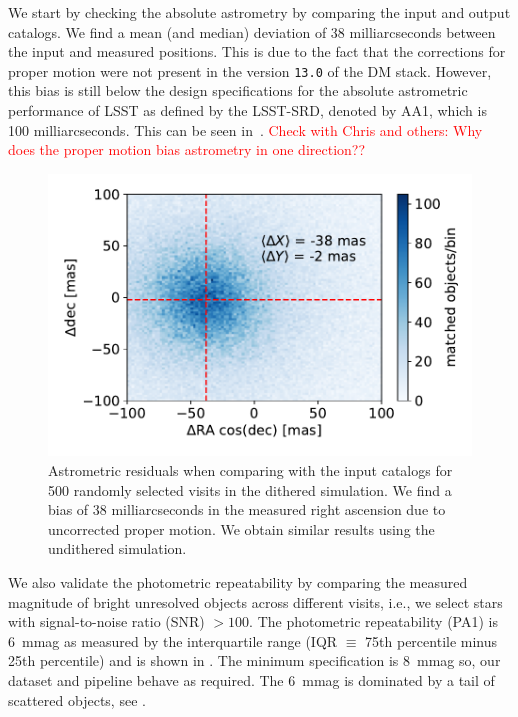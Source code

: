 \documentclass[twocolumn]{aastex62}
\begin{document}
We start by checking the absolute astrometry by comparing the input and output catalogs. We find a mean (and median) deviation of 38 milliarcseconds between the input and measured positions. This is due to the fact that the corrections for proper motion were not present in the version \texttt{13.0} of the DM stack. However, this bias is still below the design specifications for the absolute astrometric performance of LSST as defined by the LSST-SRD, denoted by AA1, which is 100 milliarcseconds. This can be seen in~.
\textcolor{red}{Check with Chris and others: Why does the proper motion bias astrometry in one direction??}

\begin{figure}
\centering
\includegraphics[width=0.9\columnwidth]{astrometric_residuals_single_visit_2d}
\caption{Astrometric residuals when comparing with the input catalogs for 500 randomly selected visits in the dithered simulation. We find a bias of 38 milliarcseconds in the measured right ascension due to uncorrected proper motion. We obtain similar results using the undithered simulation.}
\label{fig:AA1}
\end{figure}

We also validate the photometric repeatability by comparing the measured magnitude of bright unresolved objects across different visits, i.e., we select stars with signal-to-noise ratio (SNR) $> 100$. The photometric repeatability (PA1) is 6~mmag as measured by the interquartile range (IQR $\equiv$ 75th percentile minus 25th percentile) and is shown in . The minimum specification is 8~mmag so, our dataset and pipeline behave as required. The 6~mmag is dominated by a tail of scattered objects, see .
\end{document}

